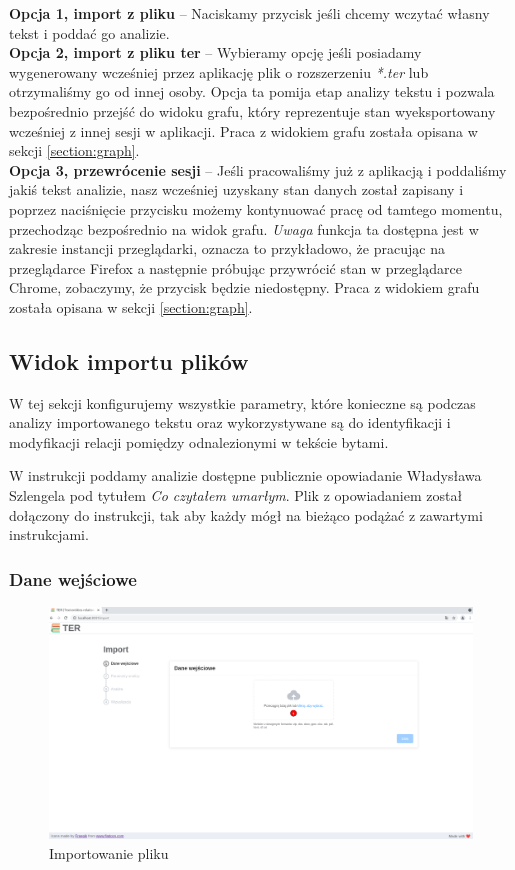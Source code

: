 \documentclass[12pt, a4paper]{article}
\begin{document}
\textbf{Opcja 1, import z pliku} -- Naciskamy przycisk jeśli chcemy wczytać własny tekst i poddać go analizie.\\

\noindent\textbf{Opcja 2, import z pliku ter} -- Wybieramy opcję jeśli posiadamy wygenerowany wcześniej przez aplikację plik o rozszerzeniu \textit{*.ter} lub otrzymaliśmy go od innej osoby. Opcja ta pomija etap analizy tekstu i pozwala bezpośrednio przejść do widoku grafu, który reprezentuje stan wyeksportowany wcześniej z innej sesji w aplikacji. Praca z widokiem grafu została opisana w sekcji \ref{section:graph}.\\

\noindent\textbf{Opcja 3, przewrócenie sesji} -- Jeśli pracowaliśmy już z aplikacją i poddaliśmy jakiś tekst analizie, nasz wcześniej uzyskany stan danych został zapisany i poprzez naciśnięcie przycisku możemy kontynuować pracę od tamtego momentu, przechodząc bezpośrednio na widok grafu. \textit{Uwaga} funkcja ta dostępna jest w zakresie instancji przeglądarki, oznacza to przykładowo, że pracując na przeglądarce Firefox a następnie próbując przywrócić stan w przeglądarce Chrome, zobaczymy, że przycisk będzie niedostępny. Praca z widokiem grafu została opisana w sekcji \ref{section:graph}.

\pagebreak

\subsection{Widok importu plików}

W tej sekcji konfigurujemy wszystkie parametry, które konieczne są podczas analizy importowanego tekstu oraz wykorzystywane są do identyfikacji i modyfikacji relacji pomiędzy odnalezionymi w tekście bytami.

W instrukcji poddamy analizie dostępne publicznie opowiadanie Władysława Szlengela pod tytułem \textit{Co czytałem umarłym}. Plik z opowiadaniem został dołączony do instrukcji, tak aby każdy mógł na bieżąco podążać z zawartymi instrukcjami.

\subsubsection{Dane wejściowe}

\begin{figure}[H]
    \centering
    \includegraphics[width=\linewidth]{images/import-before-file.png}
    \caption{Importowanie pliku}
\end{figure}
\end{document}
